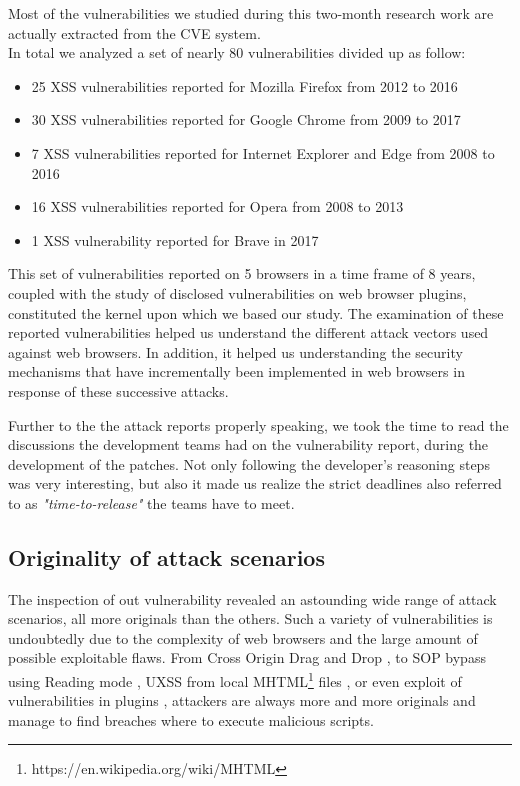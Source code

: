 \documentclass[journal]{IEEEtran}
\begin{document}
Most of the vulnerabilities we studied during this two-month research work are actually extracted from the CVE system. \\

In total we analyzed a set of nearly 80 vulnerabilities divided up as follow:

\begin{itemize}
\item 25 XSS vulnerabilities reported for Mozilla Firefox from 2012 to 2016
\item 30 XSS vulnerabilities reported for Google Chrome from 2009 to 2017
\item 7 XSS vulnerabilities reported for Internet Explorer and Edge from 2008 to 2016
\item 16 XSS vulnerabilities reported for Opera from 2008 to 2013
\item 1 XSS vulnerability reported for Brave in 2017
\end{itemize}

This set of vulnerabilities reported on 5 browsers in a time frame of 8 years, coupled with the study of disclosed vulnerabilities on web browser plugins, constituted the kernel upon which we based our study. The examination of these reported vulnerabilities helped us understand the different attack vectors used against web browsers. In addition, it helped us understanding the security mechanisms that have incrementally been implemented in web browsers in response of these successive attacks.

\medskip

Further to the the attack reports properly speaking, we took the time to read the discussions the development teams had on the vulnerability report, during the development of the patches. Not only following the developer's reasoning steps was very interesting, but also it made us realize the strict deadlines also referred to as \emph{"time-to-release"} the teams have to meet.


\subsection{Originality of attack scenarios}

The inspection of out vulnerability revealed an astounding wide range of attack scenarios, all more originals than the others. Such a variety of vulnerabilities is undoubtedly due to the complexity of web browsers and the large amount of possible exploitable flaws. From Cross Origin Drag and Drop \cite{CVE-2013-2849}, to SOP bypass using Reading mode \cite{edgeReadingModeUXSS}, UXSS from local MHTML\footnote{https://en.wikipedia.org/wiki/MHTML} files \cite{CVE-2014-1747}, or even exploit of vulnerabilities in plugins \cite{uxssPDF} \cite{uxssKeybase}, attackers are always more and more originals and manage to find breaches where to execute malicious scripts.
\end{document}
